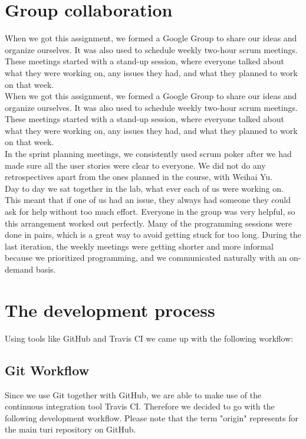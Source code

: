\documentclass[a4paper]{article}
\begin{document}
\section{Group collaboration}
When we got this assignment, we formed a Google Group to share our ideas and organize ourselves. It was also used to schedule weekly two-hour scrum meetings. These meetings started with a stand-up session, where everyone talked about what they were working on, any issues they had, and what they planned to work on that week.\\

When we got this assignment, we formed a Google Group to share our ideas and organize ourselves. It was also used to schedule weekly two-hour scrum meetings. These meetings started with a stand-up session, where everyone talked about what they were working on, any issues they had, and what they planned to work on that week.\\

\noindent
In the sprint planning meetings, we consistently used scrum poker after we had made sure all the user stories were clear to everyone. We did not do any retrospectives apart from the ones planned in the course, with Weihai Yu.\\

\noindent
Day to day we sat together in the lab, what ever each of us were working on. This meant that if one of us had an issue, they always had someone they could ask for help without too much effort. Everyone in the group was very helpful, so this arrangement worked out perfectly. Many of the programming sessions were done in pairs, which is a great way to avoid getting stuck for too long. During the last iteration, the weekly meetings were getting shorter and more informal because we prioritized programming, and we communicated naturally with an on-demand basis.




\section{The development process}

Using tools like GitHub and Travis CI we came up with the following workflow:

\subsection{Git Workflow}
Since we use Git together with GitHub, we are able to make use of the continuous integration tool Travis CI. Therefore we decided to go with the following development workflow. Please note that the term "origin" represents for the main turi repository on GitHub.
\end{document}
